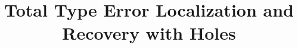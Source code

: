 \documentclass{article}
\title{Total Type Error Localization and Recovery with Holes}
\date{}
\begin{document}
\maketitle

\tableofcontents
\newpage

\renewcommand{\thesection}{\Alph{section}}


\newpage


\newpage


\newpage


\newpage


\newpage


\newpage


\end{document}

